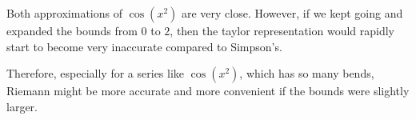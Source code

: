 \documentclass[12pt]{article}
\begin{document}
Both approximations of $\cos(x^2)$ are very close. However, if we kept going and expanded the bounds from $0$ to $2$, then the taylor representation would rapidly start to become very inaccurate compared to Simpson's.

Therefore, especially for a series like $\cos(x^2)$, which has so many bends, Riemann might be more accurate and more convenient if the bounds were slightly larger.
\end{document}
